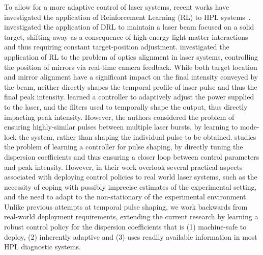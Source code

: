 To allow for a more adaptive control of laser systems, recent works have investigated the application of Reinforcement Learning (RL) to HPL systems~\citep{kuprikov2022deep, rakhmatulin2024reinforcement, mareev2023self, capuano2023temporl}. \cite{mareev2023self} investigated the application of DRL to maintain a laser beam focused on a solid target, shifting away as a consequence of high-energy light-matter interactions and thus requiring constant target-position adjustment. \cite{rakhmatulin2024reinforcement} investigated the application of RL to the problem of optics alignment in laser systems, controlling the position of mirrors via real-time camera feedback. While both target location and mirror alignment have a significant impact on the final intensity conveyed by the beam, neither directly shapes the temporal profile of laser pulse and thus the final peak intensity. \cite{kuprikov2022deep} learned a controller to adaptively adjust the power supplied to the laser, and the filters used to temporally shape the output, thus directly impacting peak intensity. However, the authors considered the problem of ensuring highly-similar pulses between multiple laser bursts, by learning to mode-lock the system, rather than shaping the individual pulse to be obtained. \cite{capuano2023temporl} studies the problem of learning a controller for pulse shaping, by directly tuning the dispersion coefficients and thus ensuring a closer loop between control parameters and peak intensity. However, in their work \cite{capuano2023temporl} overlook several practical aspects associated with deploying control policies to real world laser systems, such as the necessity of coping with possibly imprecise estimates of the experimental setting, and the need to adapt to the non-stationary of the experimental environment. Unlike previous attempts at temporal pulse shaping, we work backwards from real-world deployment requirements, extending the current research by learning a robust control policy for the dispersion coefficients that is (1) machine-safe to deploy, (2) inherently adaptive and (3) uses readily available information in most HPL diagnostic systems.

